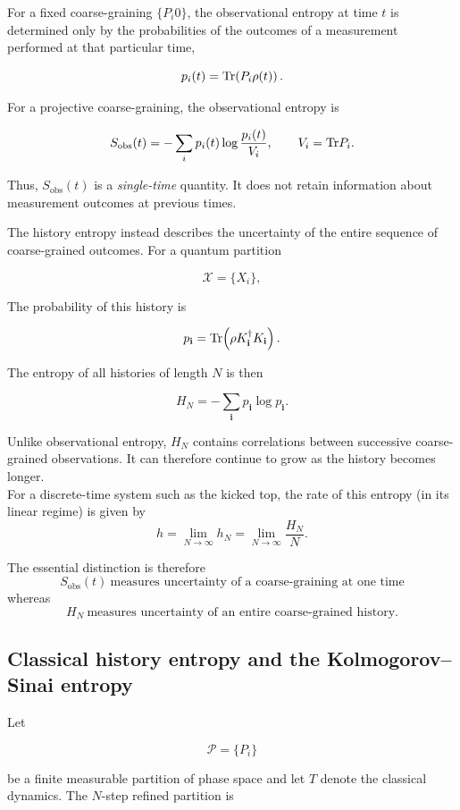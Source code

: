 \documentclass{article}
\begin{document}
For a fixed coarse-graining $\{P_i0\}$, the observational entropy at time $t$ is determined only by the probabilities of the outcomes of a measurement performed at that particular time,


\[
p_i(t)=\text{Tr}\!\left(P_i\rho(t)\right).
\]

For a projective coarse-graining, the observational entropy is

\[
S_{\mathrm{obs}}(t)=-\sum_i p_i(t)
\log\frac{p_i(t)}{V_i},\qquad V_i=\text{Tr} P_i.
\]

Thus, $S_{\mathrm{obs}}(t)$ is a \emph{single-time} quantity. It does not retain information about measurement outcomes at previous times.

The history entropy instead describes the uncertainty of the entire sequence of coarse-grained outcomes. For a quantum partition

$$
\mathcal X=\{X_i\},
$$

The probability of this history is

$$
p_{\mathbf{i}}
=
\text{Tr}\!\left(
\rho K_{\mathbf{i}}^\dagger K_{\mathbf{i}}
\right).
$$

The entropy of all histories of length $N$ is then

$$
H_N
=
-\sum_{\mathbf{i}}
p_{\mathbf{i}}\log p_{\mathbf{i}}.
$$

Unlike observational entropy, $H_N$ contains correlations between successive coarse-grained observations. It can therefore continue to grow as the history becomes longer.\\
For a discrete-time system such as the kicked top, the rate of this entropy (in its linear regime) is given by 
$$
h
=
\lim_{N\to\infty}h_N
=
\lim_{N\to\infty}\frac{H_N}{N}.
$$

The essential distinction is therefore
$$
S_{\mathrm{obs}}(t)
\ \text{measures uncertainty of a coarse-graining at one time}
$$
whereas
$$
H_N
\ \text{measures uncertainty of an entire coarse-grained history}.
$$



\subsection{Classical history entropy and the Kolmogorov--Sinai entropy}

Let

$$
\mathcal P=\{P_i\}
$$

be a finite measurable partition of phase space and let $T$ denote the classical dynamics. The $N$-step refined partition is
\end{document}

